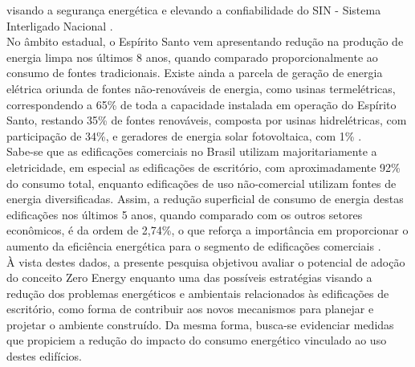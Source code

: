      visando a segurança energética  e  elevando  a  confiabilidade  do  SIN  -  Sistema  Interligado
     Nacional \cite{EmpresadePesquisaEnergetica-EPE2017a}.\\ No âmbito estadual, o Espírito Santo 
     vem apresentando redução na produção de energia limpa nos últimos 8 anos, quando comparado 
     proporcionalmente ao consumo de fontes tradicionais. Existe ainda a parcela de geração de 
     energia elétrica oriunda de fontes não-renováveis de energia, como usinas termelétricas, 
     correspondendo a 65\% de toda a capacidade instalada em operação do  Espírito  Santo,  
     restando  35\%  de  fontes  renováveis,  composta  por  usinas  hidrelétricas,  com 
     participação  de  34\%,  e  geradores  de  energia  solar  fotovoltaica,  com  1\% 
     \cite{AgenciadeRegulacaodeServicosPublicosdoEspiritoSanto-ARSP2019,EnergiasdePortugal-EDP2017}.\\
     Sabe-se  que  as  edificações  comerciais no  Brasil  utilizam  majoritariamente  a  eletricidade,  
     em especial  as  edificações  de escritório,  com  aproximadamente  92\%  do  consumo  total,  enquanto edificações  de  
     uso  não-comercial  utilizam  fontes  de  energia  diversificadas.  Assim,  a  redução 
     superficial de consumo de energia destas edificações nos últimos 5 anos, quando comparado 
     com os  outros  setores  econômicos,  é  da  ordem  de  2,74\%,  o  que  reforça  a  
     importância  em proporcionar  o  aumento  da  eficiência  energética  para  o  segmento  
     de  edificações  comerciais \cite{AgenciadeRegulacaodeServicosPublicosdoEspiritoSanto-ARSP2018,
     AgenciadeRegulacaodeServicosPublicosdoEspiritoSanto-ARSP2019,
     EmpresadePesquisaEnergetica-EPE2018}.\\
     À vista  destes dados,  a presente pesquisa objetivou avaliar  o  potencial de adoção  do  conceito Zero  
     Energy   enquanto   uma  das  possíveis   estratégias  visando   a   redução   dos  
     problemas energéticos e ambientais relacionados às edificações de escritório, como forma 
     de contribuir aos novos mecanismos para planejar e projetar o ambiente construído. Da mesma 
     forma, busca-se evidenciar  medidas que propiciem  a  redução  do impacto  do  consumo  
     energético  vinculado  ao uso destes edifícios. 